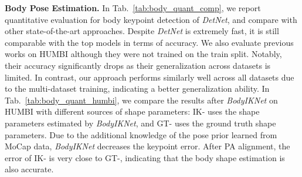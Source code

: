 \documentclass[final]{cvpr}
\begin{document}
\par
\noindent \textbf{Body Pose Estimation.}
In Tab.~\ref{tab:body_quant_comp}, we report quantitative evaluation for body keypoint detection of \textit{DetNet}, and compare with other state-of-the-art approaches.
Despite \textit{DetNet} is extremely fast, it is still comparable with the top models in terms of accuracy.
We also evaluate previous works on HUMBI although they were not trained on the train split.
Notably, their accuracy significantly drops as their generalization across datasets is limited.
In contrast, our approach performs similarly well across all datasets due to the multi-dataset training, indicating a better generalization ability.
In Tab.~\ref{tab:body_quant_humbi}, we compare the results after \textit{BodyIKNet} on HUMBI with different sources of shape parameters: IK- uses the shape parameters estimated by \textit{BodyIKNet}, and GT- uses the ground truth shape parameters.
Due to the additional knowledge of the pose prior learned from MoCap data, \textit{BodyIKNet} decreases the keypoint error.
After PA alignment, the error of IK- is very close to GT-, indicating that the body shape estimation is also accurate.
\begin{table}[t]
  \centering
  \caption{
Body MPJPE on public datasets.
Our model has competitive results across all datasets while being much faster.
 means the model is not trained on the train split.
}
  \label{tab:body_quant_comp}
\end{table}
\end{document}
